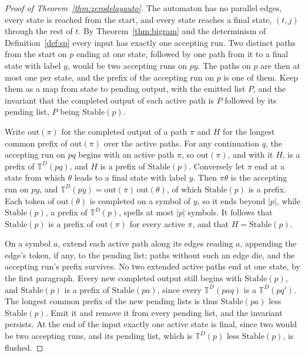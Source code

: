 \documentclass[11pt,a4paper]{article}
\theoremstyle{definition}
\theoremstyle{plain}
\newcommand{\T}{\mathbb{T}}
\newcommand{\Stable}{\mathrm{Stable}}
\begin{document}
\begin{proof}[Proof of Theorem~\ref{thm:zerodelayauto}]
The automaton has no parallel edges, every state is reached from the start, and every state reaches a final state,
\((t, j)\) through the rest of \(t\). By Theorem~\ref{thm:bigram} and the determinism of Definition~\ref{def:sp} every
input has exactly one accepting run. Two distinct paths from the start on \(p\) ending at one state, followed by one
path from it to a final state with label \(y\), would be two accepting runs on \(py\). The paths on \(p\) are then at
most one per state, and the prefix of the accepting run on \(p\) is one of them. Keep them as a map from state to
pending output, with the emitted list \(P\), and the invariant that the completed output of each active path is \(P\)
followed by its pending list, \(P\) being \(\Stable(p)\).

Write \(\mathrm{out}(\pi)\) for the completed output of a path \(\pi\) and \(H\) for the longest common prefix of
\(\mathrm{out}(\pi)\) over the active paths. For any continuation \(q\), the accepting run on \(pq\) begins with an
active path \(\pi\), so \(\mathrm{out}(\pi)\), and with it \(H\), is a prefix of \(\T^D(pq)\), and \(H\) is a prefix of
\(\Stable(p)\). Conversely let \(\pi\) end at a state from which \(\theta\) leads to a final state with label \(y\).
Then \(\pi\theta\) is the accepting run on \(py\), and \(\T^D(py) = \mathrm{out}(\pi)\,\mathrm{out}(\theta)\), of which
\(\Stable(p)\) is a prefix. Each token of \(\mathrm{out}(\theta)\) is completed on a symbol of \(y\), so it ends beyond
\(|p|\), while \(\Stable(p)\), a prefix of \(\T^D(p)\), spells at most \(|p|\) symbols. It follows that \(\Stable(p)\)
is a prefix of \(\mathrm{out}(\pi)\) for every active \(\pi\), and that \(H = \Stable(p)\).

On a symbol \(a\), extend each active path along its edges reading \(a\), appending the edge's token, if any, to the
pending list; paths without such an edge die, and the accepting run's prefix survives. No two extended active paths end
at one state, by the first paragraph. Every new completed output still begins with \(\Stable(p)\), and \(\Stable(p)\) is
a prefix of \(\Stable(pa)\), since every \(\T^D(paq)\) is a \(\T^D(pq')\). The longest common prefix of the new pending
lists is thus \(\Stable(pa)\) less \(\Stable(p)\). Emit it and remove it from every pending list, and the invariant
persists. At the end of the input exactly one active state is final, since two would be two accepting runs, and its
pending list, which is \(\T^D(p)\) less \(\Stable(p)\), is flushed.


\end{proof}
\end{document}
